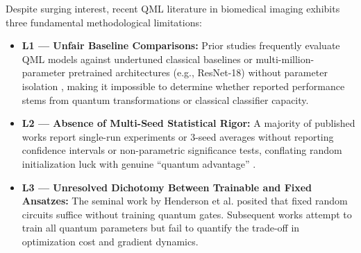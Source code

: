 \documentclass[runningheads]{llncs}
\begin{document}
Despite surging interest, recent QML literature in biomedical imaging \cite{vu2024exploring,altares2021automatic,azevedo2022quantum,hoang2023efficient,matondo2024breast,schuld2022advantage} exhibits three fundamental methodological limitations:
\begin{itemize}
    \item \textbf{L1 --- Unfair Baseline Comparisons:} Prior studies frequently evaluate QML models against undertuned classical baselines or multi-million-parameter pretrained architectures (e.g., ResNet-18) without parameter isolation \cite{azevedo2022quantum}, making it impossible to determine whether reported performance stems from quantum transformations or classical classifier capacity.
    \item \textbf{L2 --- Absence of Multi-Seed Statistical Rigor:} A majority of published works report single-run experiments or 3-seed averages without reporting confidence intervals or non-parametric significance tests, conflating random initialization luck with genuine ``quantum advantage'' \cite{kubler2021inductive}.
    \item \textbf{L3 --- Unresolved Dichotomy Between Trainable and Fixed Ansatzes:} The seminal work by Henderson et al. \cite{henderson2020quanvolutional} posited that fixed random circuits suffice without training quantum gates. Subsequent works attempt to train all quantum parameters but fail to quantify the trade-off in optimization cost and gradient dynamics.
\end{itemize}
\end{document}
